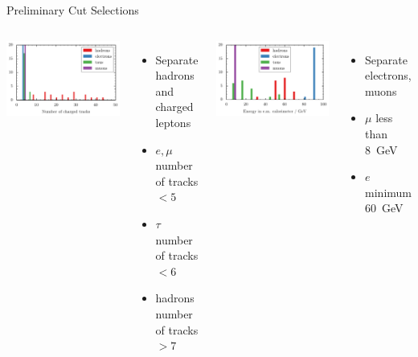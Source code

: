 \documentclass[11pt,xcolor=dvipsnames,professionalfonts]{beamer}
\begin{document}
\begin{frame}{Preliminary Cut Selections}
	\begin{columns}
			\includegraphics[width=1.0\textwidth]{./talkfigs/pdf/Ctrk(N).pdf}\\
			\begin{itemize}
				\item Separate hadrons and charged leptons
				\item \textbf{$e, \mu$} number of tracks $<5$
				\item $\tau$ number of tracks $<6$
				\item hadrons number of tracks $>7$
			\end{itemize}
			\includegraphics[width=1.0\textwidth]{./talkfigs/pdf/Ecal(SumE).pdf}
			\begin{itemize}
				\item Separate electrons, muons
				\item $\mu$ less than \SI{8}{GeV}
				\item $e$ minimum \SI{60}{GeV}
				\vspace{2.8em}
			\end{itemize}
	\end{columns}
\end{frame}
\end{document}
